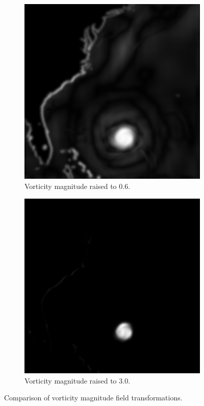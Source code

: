 \documentclass{article}
\begin{document}
\begin{figure}[h!]
\begin{subfigure}{0.32\textwidth}
        \includegraphics[width=\textwidth]{pow_0_6.png}
        \caption{Vorticity magnitude raised to 0.6.}
    \end{subfigure}
    \hfill
    \begin{subfigure}{0.32\textwidth}
        \centering
        \includegraphics[width=\textwidth]{pow_3_0.png}
        \caption{Vorticity magnitude raised to 3.0.}
    \end{subfigure}
    \caption{Comparison of vorticity magnitude field transformations.}
\end{figure}
\end{document}
